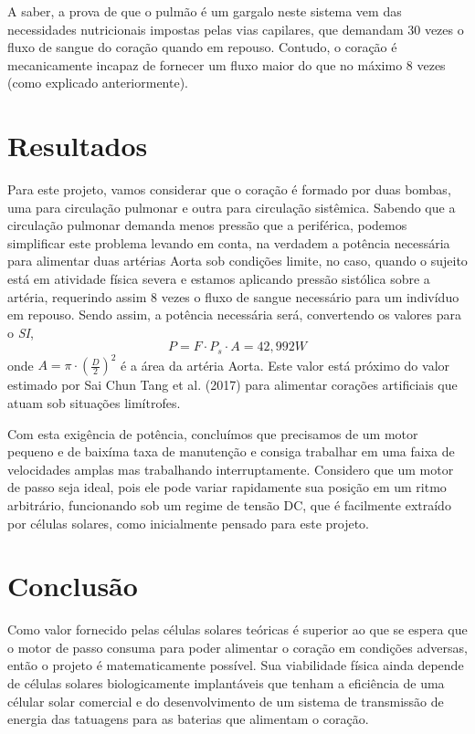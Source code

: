 \documentclass[12pt, a4paper, twoside]{article}
\begin{document}
A saber, a prova de que o pulmão é um gargalo neste sistema vem das necessidades nutricionais impostas pelas vias capilares, que demandam 30 vezes o fluxo de sangue do coração quando em repouso. Contudo, o coração é mecanicamente incapaz de fornecer um fluxo maior do que no máximo 8 vezes (como explicado anteriormente).

\section{Resultados}

Para este projeto, vamos considerar que o coração é formado por duas bombas, uma para circulação pulmonar e outra para circulação sistêmica. Sabendo que a circulação pulmonar demanda menos pressão que a periférica, podemos simplificar este problema levando em conta, na verdadem a potência necessária para alimentar duas artérias Aorta sob condições limite, no caso, quando o sujeito está em atividade física severa e estamos aplicando pressão sistólica sobre a artéria, requerindo assim 8 vezes o fluxo de sangue necessário para um indivíduo em repouso. Sendo assim, a potência necessária será, convertendo os valores para o \textit{SI},
$$ P = F \cdot P_s \cdot A = 42,992 W $$
onde $A = \pi \cdot\left(\frac{D}{2}\right)^2$ é a área da artéria Aorta. Este valor está próximo do valor estimado por Sai Chun Tang et al. (2017) para alimentar corações artificiais que atuam sob situações limítrofes.

Com esta exigência de potência, concluímos que precisamos de um motor pequeno e de baixíma taxa de manutenção e consiga trabalhar em uma faixa de velocidades amplas mas trabalhando interruptamente. Considero que um motor de passo seja ideal, pois ele pode variar rapidamente sua posição em um ritmo arbitrário, funcionando sob um regime de tensão DC, que é facilmente extraído por células solares, como inicialmente pensado para este projeto.

\section{Conclusão}

 Como valor fornecido pelas células solares teóricas é superior ao que se espera que o motor de passo consuma para poder alimentar o coração em condições adversas, então o projeto é matematicamente possível. Sua viabilidade física ainda depende de células solares biologicamente implantáveis que tenham a eficiência de uma célular solar comercial e do desenvolvimento de um sistema de transmissão de energia das tatuagens para as baterias que alimentam o coração.
\end{document}
